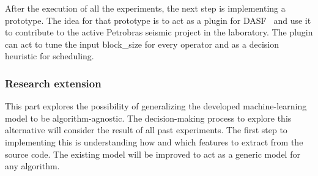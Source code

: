 After the execution of all the experiments, the next step is implementing a prototype.
The idea for that prototype is to act as a plugin for \ac{DASF}~\cite{dasf} and use it to contribute to the active Petrobras seismic project in the laboratory.
The plugin can act to tune the input block\_size for every operator and as a decision heuristic for scheduling.

\subsubsection{Research extension}

This part explores the possibility of generalizing the developed machine-learning model to be algorithm-agnostic.
The decision-making process to explore this alternative will consider the result of all past experiments.
The first step to implementing this is understanding how and which features to extract from the source code.
The existing model will be improved to act as a generic model for any algorithm.
